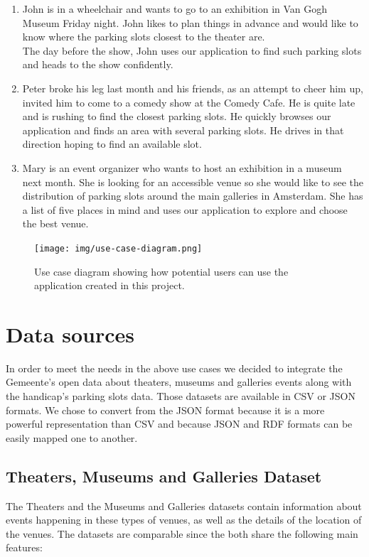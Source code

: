 \documentclass[runningheads,a4paper]{../../StyleFiles/llncs}
\begin{document}
\begin{enumerate}
	\item John is in a wheelchair and wants to go to an exhibition in Van Gogh Museum Friday night. John likes to plan things in advance and would like to know where the parking slots closest to the theater are. \\
	The day before the show, John uses our application to find such parking slots and heads to the show confidently. 
	\item Peter broke his leg last month and his friends, as an attempt to cheer him up, invited him to come to a comedy show at the Comedy Cafe. He is quite late and is rushing to find the closest parking slots. He quickly browses our application and finds an area with several parking slots. He drives in that direction hoping to find an available slot. 
	\item Mary is an event organizer who wants to host an exhibition in a museum next month. She is looking for an accessible venue so she would like to see the distribution of parking slots around the main galleries in Amsterdam. She has a list of five places in mind and uses our application to explore and choose the best venue.
\end{enumerate}

\begin{figure}[ht]
	\centering
	\texttt{[image: img/use-case-diagram.png]}
	\caption{Use case diagram showing how potential users can use the application created in this project.}
	\label{fig:use-case}
\end{figure}

\section{Data sources}
In order to meet the needs in the above use cases we decided to integrate the Gemeente's open data about theaters, museums and galleries events along with the handicap's parking slots data. Those datasets are available in CSV or JSON formats. We chose to convert from the JSON format because it is a more powerful representation than CSV and because JSON and RDF formats can be easily mapped one to another.

\subsection{Theaters, Museums and Galleries Dataset}
The Theaters and the Museums and Galleries datasets contain information about events happening in these types of venues, as well as the details of the location of the venues. The datasets are comparable since the both share the following main features:
\end{document}
